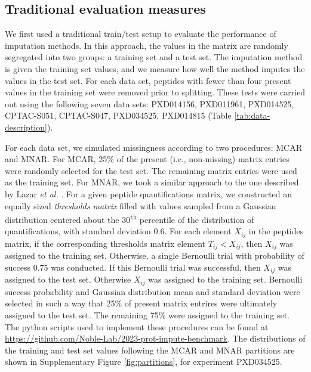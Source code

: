 \documentclass{article}
\begin{document}
\subsection{Traditional evaluation measures}

We first used a traditional train/test setup to evaluate the performance of imputation methods. In this approach, the values in the matrix are randomly segregated into two groups: a training set and a test set.  The imputation method is given the training set values, and we measure how well the method imputes the values in the test set.  For each data set, peptides with fewer than four present values in the training set were removed prior to splitting.  These tests were carried out using the following seven data sets: PXD014156, PXD011961, PXD014525, CPTAC-S051, CPTAC-S047, PXD034525, PXD014815 (Table \ref{tab:data-description}).

For each data set, we simulated missingness according to two procedures: MCAR and MNAR. For MCAR, 25\% of the present (i.e., non-missing) matrix entries were randomly selected for the test set. The remaining matrix entries were used as the training set.  For MNAR, we took a similar approach to the one described by Lazar \textit{et al.} \cite{lazar}. For a given peptide quantifications matrix, we constructed an equally sized \textit{thresholds matrix} filled with values sampled from a Gaussian distribution centered about the 30\textsuperscript{th} percentile of the distribution of quantifications, with standard deviation 0.6. For each element $X_{ij}$ in the peptides matrix, if the corresponding thresholds matrix element $T_{ij} < X_{ij}$, then $X_{ij}$ was assigned to the training set. Otherwise, a single Bernoulli trial with probability of success 0.75 was conducted.  If this Bernoulli trial was successful, then $X_{ij}$ was assigned to the test set. Otherwise $X_{ij}$ was assigned to the training set. Bernoulli success probability and Gaussian distribution mean and standard deviation were selected in such a way that 25\% of present matrix entrires were ultimately assigned to the test set. The remaining 75\% were assigned to the training set. The python scripts used to implement these procedures can be found at \url{https://github.com/Noble-Lab/2023-prot-impute-benchmark}. The distributions of the training and test set values following the MCAR and MNAR partitions are shown in Supplementary Figure \ref{fig:partitions}, for experiment PXD034525.
\end{document}
